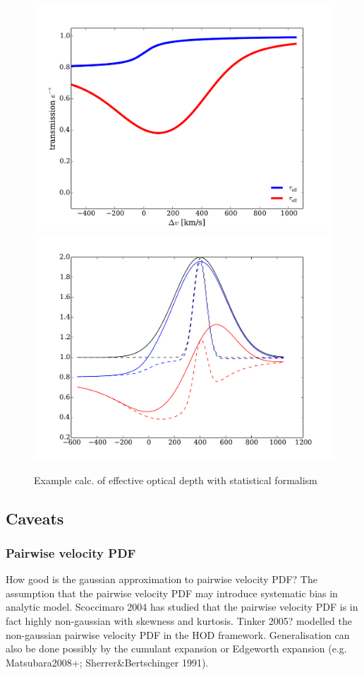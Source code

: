 \documentclass[useAMS,usenatbib,twocolumn]{mn2e}
\begin{document}
\begin{figure}
 \begin{center}
  \includegraphics[angle=0,width=\columnwidth]{figure/test_eff_optdpt.pdf}
  \includegraphics[angle=0,width=\columnwidth]{figure/test_lya_profile.pdf}
  \caption{Example calc. of effective optical depth with statistical formalism}
 \end{center}
\end{figure}



\subsection{Caveats}
\subsubsection{Pairwise velocity PDF}
How good is the gaussian approximation to pairwise velocity PDF? The assumption
that the pairwise velocity PDF may introduce systematic bias in analytic model.
Scoccimaro 2004 has studied that the pairwise velocity PDF is in fact highly
non-gaussian with skewness and kurtosis. Tinker 2005? modelled the non-gaussian
pairwise velocity PDF in the HOD framework. Generalisation can also be done
possibly by the cumulant expansion or Edgeworth expansion 
(e.g. Matsubara2008+; Sherrer\&Bertschinger 1991).
\end{document}

